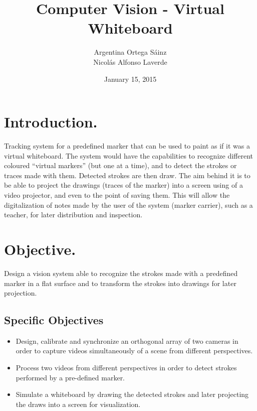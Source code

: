 \documentclass[a4paper,12pt]{article}
\title{Computer Vision - Virtual Whiteboard}
\author{Argentina Ortega Sáinz \\
        Nicolás Alfonso Laverde}
\date{January 15, 2015}
\begin{document}
\maketitle
{}







\section{Introduction.}
Tracking system for a predefined marker that can be used to paint as if it was a virtual whiteboard. The system would have the capabilities to recognize different coloured “virtual markers” (but one at a time), and to detect the strokes or traces made with them. Detected strokes are then draw.
The aim behind it is to be able to project the drawings (traces of the marker) into a screen using of a video projector, and even to the point of saving them. This will allow the digitalization of notes made by the user of the system (marker carrier), such as a teacher, for later distribution and inspection.
\section{Objective.}
Design a vision system able to recognize the strokes made with a predefined marker in a flat surface and to transform the strokes into drawings for later projection.
\subsection{Specific Objectives}
\begin{itemize}
\item Design, calibrate and synchronize an orthogonal array of two cameras in order to capture videos simultaneously of a scene from different perspectives.
\item Process two videos from different perspectives in order to detect strokes performed by a pre-defined marker.
\item Simulate a whiteboard by drawing the detected strokes and later projecting the draws into a screen for visualization.
\end{itemize}
\end{document}
